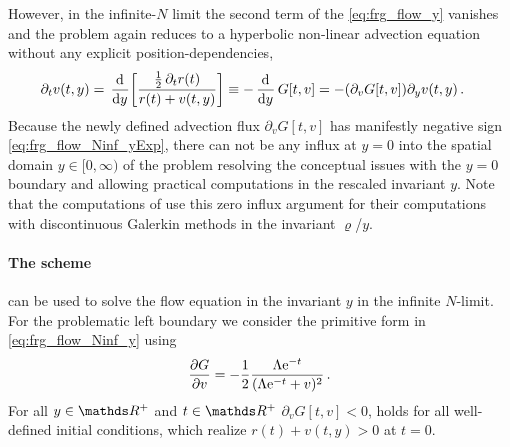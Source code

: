However, in the infinite-$N$ limit the second term of the \pde{} \eqref{eq:frg_flow_y} vanishes and the problem again reduces to a hyperbolic non-linear advection equation \dash{} without any explicit position-dependencies,
	\begin{align}
		\partial_t v ( t, y )  &= \, \dod{}{y} \!\bigg[ \frac{\tfrac{1}{2} \, \partial_t r ( t )}{r ( t ) + v ( t, y )} \bigg]\equiv - \dod{}{y} G [ t, v ]  = - (\partial_v G [ t, v ]) \partial_y v(t,y)\, . \label{eq:frg_flow_Ninf_y}
	\end{align}
Because the newly defined advection flux $\partial_v G [ t, v ]$ has manifestly negative sign \dash{} \cf{} \cref{eq:frg_flow_Ninf_yExp}, there can not be any influx at $y = 0$ into the spatial domain $y \in [ 0, \infty )$ of the problem resolving the conceptual issues with the $y = 0$ boundary and allowing practical computations in the rescaled invariant $y$.
Note that the computations of  use this zero influx argument for their computations with discontinuous Galerkin methods in the invariant $\varrho$/$y$.

\paragraph{The \knp{} scheme}\label{paragraph:knpLargeN} can be used to solve the flow equation in the invariant $y$ in the infinite $N$-limit.
For the problematic left boundary we consider the primitive form in \cref{eq:frg_flow_Ninf_y} using
\begin{align}
	\frac{\partial G}{\partial v}= -\frac{1}{2} \frac{\Lambda\mathrm{e}^{-t}}{(\Lambda\mathrm{e}^{-t} + v)^2}\, . \label{eq:frg_flow_Ninf_yExp}
\end{align}
For all $y\in\Reals{}^+$ and $t\in\Reals{}^+$ $\partial_v G [ t, v ] < 0$, holds for all well-defined initial conditions, which realize $r ( t ) + v ( t, y ) > 0$ at $t=0$. 

